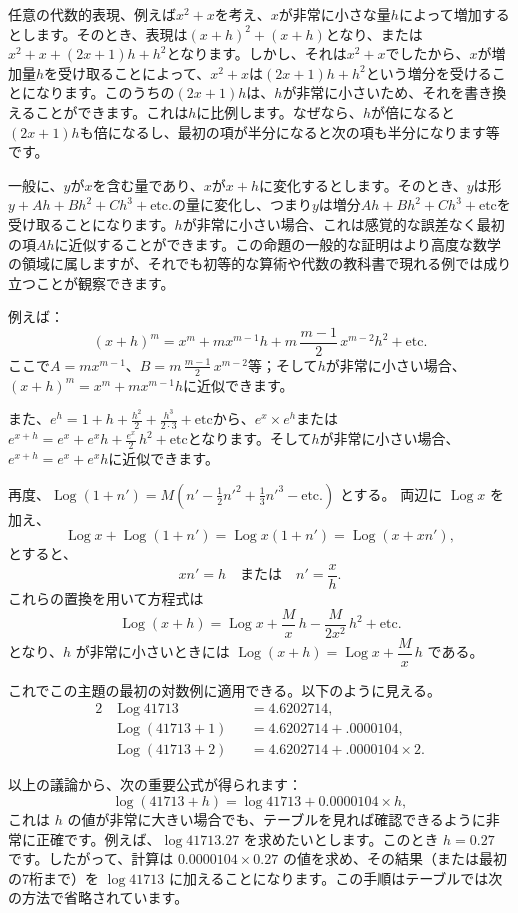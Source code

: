 \documentclass[a4paper,11pt,openany]{ltjsbook}
\newcommand{\etc}{\text{etc}}
\newcommand{\Log}{\operatorname{Log}}
\begin{document}
任意の代数的表現、例えば$x^2 + x$を考え、$x$が非常に小さな量$h$によって増加するとします。そのとき、表現は$(x + h)^2 + (x + h)$となり、または$x^2 + x + (2x + 1)h + h^2$となります。しかし、それは$x^2 + x$でしたから、$x$が増加量$h$を受け取ることによって、$x^2 + x$は$(2x + 1)h + h^2$という増分を受けることになります。このうちの$(2x + 1)h$は、$h$が非常に小さいため、それを書き換えることができます。これは$h$に比例します。なぜなら、$h$が倍になると$(2x + 1)h$も倍になるし、最初の項が半分になると次の項も半分になります等です。

一般に、$y$が$x$を含む量であり、$x$が$x + h$に変化するとします。そのとき、$y$は形$y + Ah + Bh^2 + Ch^3 + \etc.$の量に変化し、つまり$y$は増分$Ah + Bh^2 + Ch^3 + \etc$を受け取ることになります。$h$が非常に小さい場合、これは感覚的な誤差なく最初の項$Ah$に近似することができます。この命題の一般的な証明はより高度な数学の領域に属しますが、それでも初等的な算術や代数の教科書で現れる例では成り立つことが観察できます。

例えば：
\[
(x + h)^m = x^m + mx^{m-1}h + m \, \frac{m - 1}{2} \, x^{m-2}h^2 + \etc.
\]
ここで$A = mx^{m-1}$、$B = m \, \frac{m - 1}{2} \, x^{m-2}$等；そして$h$が非常に小さい場合、$(x + h)^m = x^m + mx^{m-1}h$に近似できます。

また、$e^h = 1 + h + \frac{h^2}{2} + \frac{h^3}{2·3} + \etc$から、$e^x × e^h$または$e^{x+h} = e^x + e^x h + \frac{e^x}{2} \, h^2 + \etc$となります。そして$h$が非常に小さい場合、$e^{x+h} = e^x + e^x h$に近似できます。

再度、$\Log(1 + n') = M(n' - \frac{1}{2} n'^{2} + \frac{1}{3}n'^{3} - \etc.)$ とする。
両辺に $\Log x$ を加え、
\[
\Log x + \Log(1 + n') = \Log x(1 + n') = \Log(x + xn'),
\]
とすると、
\[
xn' = h \quad \text{または} \quad n' = \frac{x}{h}.
\]
これらの置換を用いて方程式は
\[
\Log(x + h) = \Log x + \frac{M}{x}\, h - \frac{M}{2x^{2}}\, h^{2} + \etc.
\]
となり、$h$ が非常に小さいときには $\Log(x + h) = \Log x + \dfrac{M}{x}\, h$ である。

これでこの主題の最初の対数例に適用できる。以下のように見える。
\begin{alignat*}{2}
&\Log 41713       &&= 4.6202714, \\
&\Log (41713 + 1) &&= 4.6202714 + .0000104, \\
&\Log (41713 + 2) &&= 4.6202714 + .0000104 \times 2.
\end{alignat*}

以上の議論から、次の重要公式が得られます：
\[
\log(41713 + h) = \log 41713 + 0.0000104 \times h,
\]
これは $h$ の値が非常に大きい場合でも、テーブルを見れば確認できるように非常に正確です。例えば、$\log 41713.27$ を求めたいとします。このとき $h = 0.27$ です。したがって、計算は $0.0000104 \times 0.27$ の値を求め、その結果（または最初の7桁まで）を $\log 41713$ に加えることになります。この手順はテーブルでは次の方法で省略されています。
\end{document}
